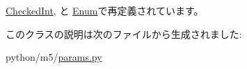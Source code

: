 \hyperlink{classm5_1_1params_1_1CheckedInt_adfc4d1824f4ecdcbb04ceafc5bbc933e}{CheckedInt}, と \hyperlink{classm5_1_1params_1_1Enum_adfc4d1824f4ecdcbb04ceafc5bbc933e}{Enum}で再定義されています。

このクラスの説明は次のファイルから生成されました:\begin{DoxyCompactItemize}
\item 
python/m5/\hyperlink{params_8py}{params.py}\end{DoxyCompactItemize}
